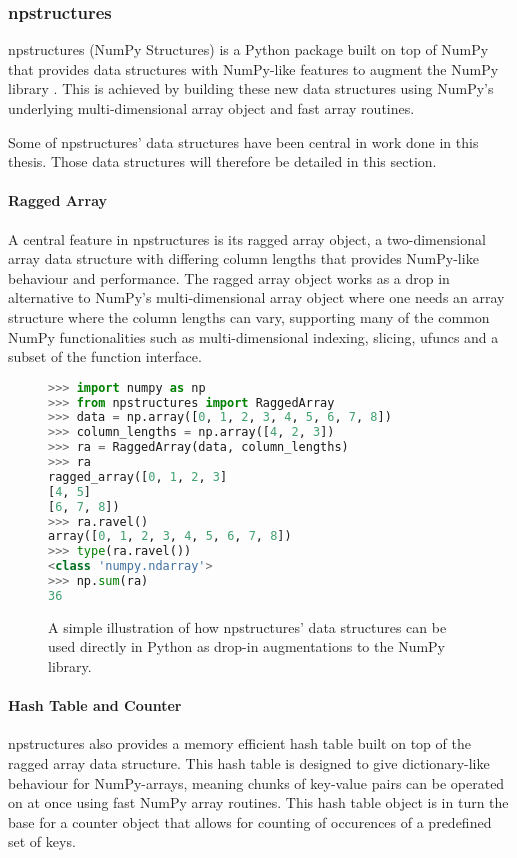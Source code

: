 \subsubsection{npstructures} \label{background:implementation_tools_and_libraries:npstructures}
npstructures (NumPy Structures) is a Python package built on top of NumPy that provides data structures with NumPy-like features to augment the NumPy library \cite{npstructures}.
This is achieved by building these new data structures using NumPy's underlying multi-dimensional array object and fast array routines.

Some of npstructures' data structures have been central in work done in this thesis.
Those data structures will therefore be detailed in this section.

\paragraph{Ragged Array}
A central feature in npstructures is its ragged array object, a two-dimensional array data structure with differing column lengths that provides NumPy-like behaviour and performance.
The ragged array object works as a drop in alternative to NumPy's multi-dimensional array object where one needs an array structure where the column lengths can vary, supporting many of the common NumPy functionalities such as multi-dimensional indexing, slicing, ufuncs and a subset of the function interface.
\begin{figure}[H]
\begin{lstlisting}[language=Python,style=console]
>>> import numpy as np
>>> from npstructures import RaggedArray
>>> data = np.array([0, 1, 2, 3, 4, 5, 6, 7, 8])
>>> column_lengths = np.array([4, 2, 3])
>>> ra = RaggedArray(data, column_lengths)
>>> ra
ragged_array([0, 1, 2, 3]
[4, 5]
[6, 7, 8])
>>> ra.ravel()
array([0, 1, 2, 3, 4, 5, 6, 7, 8])
>>> type(ra.ravel())
<class 'numpy.ndarray'>
>>> np.sum(ra)
36
\end{lstlisting}
\caption{
  A simple illustration of how npstructures' data structures can be used directly in Python as drop-in augmentations to the NumPy library.
}
\label{background:implementation_tools_and_libraries:npstructures:figure:ragged_array_example}
\end{figure}

\paragraph{Hash Table and Counter}
npstructures also provides a memory efficient hash table built on top of the ragged array data structure.
This hash table is designed to give dictionary-like behaviour for NumPy-arrays, meaning chunks of key-value pairs can be operated on at once using fast NumPy array routines.
This hash table object is in turn the base for a counter object that allows for counting of occurences of a predefined set of keys.

